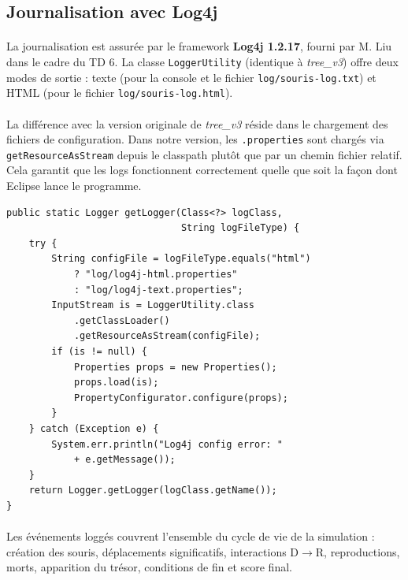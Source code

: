 \subsection{Journalisation avec Log4j}

\paragraph{} La journalisation est assurée par le framework \textbf{Log4j 1.2.17}, fourni par M. Liu dans le cadre du TD 6. La classe \texttt{LoggerUtility} (identique à \textit{tree\_v3}) offre deux modes de sortie : texte (pour la console et le fichier \texttt{log/souris-log.txt}) et HTML (pour le fichier \texttt{log/souris-log.html}).

\paragraph{} La différence avec la version originale de \textit{tree\_v3} réside dans le chargement des fichiers de configuration. Dans notre version, les \texttt{.properties} sont chargés via \texttt{getResourceAsStream} depuis le classpath plutôt que par un chemin fichier relatif. Cela garantit que les logs fonctionnent correctement quelle que soit la façon dont Eclipse lance le programme.

\begin{lstlisting}[caption={Chargement des properties Log4j via le classpath}]
public static Logger getLogger(Class<?> logClass,
                               String logFileType) {
    try {
        String configFile = logFileType.equals("html")
            ? "log/log4j-html.properties"
            : "log/log4j-text.properties";
        InputStream is = LoggerUtility.class
            .getClassLoader()
            .getResourceAsStream(configFile);
        if (is != null) {
            Properties props = new Properties();
            props.load(is);
            PropertyConfigurator.configure(props);
        }
    } catch (Exception e) {
        System.err.println("Log4j config error: "
            + e.getMessage());
    }
    return Logger.getLogger(logClass.getName());
}
\end{lstlisting}

\paragraph{} Les événements loggés couvrent l'ensemble du cycle de vie de la simulation : création des souris, déplacements significatifs, interactions D$\rightarrow$R, reproductions, morts, apparition du trésor, conditions de fin et score final.
